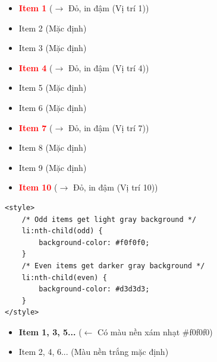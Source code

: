 \documentclass[11pt,oneside]{book}
\begin{document}
\begin{browserWindow}
\sffamily\small
\begin{itemize}[leftmargin=1.5em, itemsep=2pt, parsep=0pt]
    \item \textcolor{red}{\textbf{Item 1}} {\scriptsize\textcolor{gray!60}{($\rightarrow$ Đỏ, in đậm (Vị trí 1))}}
    \item Item 2 {\scriptsize\textcolor{gray!60}{(Mặc định)}}
    \item Item 3 {\scriptsize\textcolor{gray!60}{(Mặc định)}}
    \item \textcolor{red}{\textbf{Item 4}} {\scriptsize\textcolor{gray!60}{($\rightarrow$ Đỏ, in đậm (Vị trí 4))}}
    \item Item 5 {\scriptsize\textcolor{gray!60}{(Mặc định)}}
    \item Item 6 {\scriptsize\textcolor{gray!60}{(Mặc định)}}
    \item \textcolor{red}{\textbf{Item 7}} {\scriptsize\textcolor{gray!60}{($\rightarrow$ Đỏ, in đậm (Vị trí 7))}}
    \item Item 8 {\scriptsize\textcolor{gray!60}{(Mặc định)}}
    \item Item 9 {\scriptsize\textcolor{gray!60}{(Mặc định)}}
    \item \textcolor{red}{\textbf{Item 10}} {\scriptsize\textcolor{gray!60}{($\rightarrow$ Đỏ, in đậm (Vị trí 10))}}
\end{itemize}
\end{browserWindow}

\begin{codeWindow}
\begin{lstlisting}[language=HTML5]
<style>
    /* Odd items get light gray background */
    li:nth-child(odd) {
        background-color: #f0f0f0;
    }
    /* Even items get darker gray background */
    li:nth-child(even) {
        background-color: #d3d3d3;
    }
</style>
\end{lstlisting}
\end{codeWindow}

\begin{browserWindow}
\sffamily\small
\begin{itemize}[leftmargin=1.5em, itemsep=3pt, parsep=0pt]
    \item \colorbox{gray!20}{\textbf{Item 1, 3, 5...}} {\scriptsize\textcolor{gray!60}{($\leftarrow$ Có màu nền xám nhạt \#f0f0f0)}}
    \item Item 2, 4, 6... {\scriptsize\textcolor{gray!60}{(Màu nền trắng mặc định)}}
\end{itemize}
\end{browserWindow}
\end{document}
